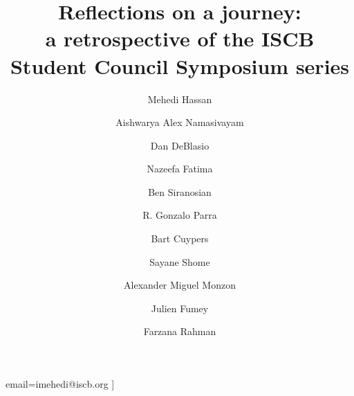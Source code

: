 \documentclass[]{article}%
\begin{document}
	
	
	\title{Reflections on a journey: \\a retrospective of the ISCB Student Council Symposium series}
	\date{}
	
	\author[1]{Mehedi Hassan}
	\author[2\textdagger]{Aishwarya Alex Namasivayam}
	\author[3\textdagger]{Dan DeBlasio}
	\author[4\textdagger]{Nazeefa Fatima}
	\author[5]{Ben Siranosian}
	\author[6]{R. Gonzalo Parra}
	\author[7]{Bart Cuypers}
	\author[8]{Sayane Shome}
	\author[9]{Alexander Miguel Monzon}
	\author[10]{Julien Fumey}
	\author[1*]{Farzana Rahman}
	
	\iffalse
	email={imehedi@iscb.org}
	]{ }
	\author[
	addressref={aff2},
	noteref={n1}
	]{ }
	\author[
	addressref={aff3},
	noteref={n1} 
	]{ }
	\author[
	addressref={aff4},
	noteref={n1} 
	]{ }
	\author[
	addressref={aff5}
	]{ }
	\author[
	addressref={aff6}
	]{ }
	\author[
	addressref={aff7}
	]{ }
	\author[
	addressref={aff8}
	]{ }
	\author[
	addressref={aff1},                   %
	corref={aff1},                       %
	email={}   %
	]{ }
	
	
\end{document}
